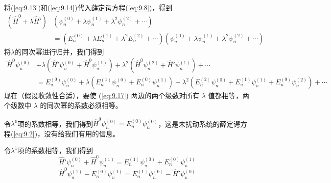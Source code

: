     将(\ref{eq:9.13})和(\ref{eq:9.14})代入薛定谔方程(\ref{eq:9.8})，得到
    \begin{equation*}
        \begin{aligned}
            \left(\hat{H}^0 + \lambda\hat{H}'\right)&\left(\psi_n^{\left(0\right)} + \lambda\psi_n^{\left(1\right)} + \lambda^2\psi_n^{\left(2\right)}+\cdots\right) \\
            &= \left(E_n^{\left(0\right)} + \lambda E_n^{\left(1\right)} + \lambda^2 E_n^{\left(2\right)}+\cdots\right)\left(\psi_n^{\left(0\right)} + \lambda\psi_n^{\left(1\right)} + \lambda^2\psi_n^{\left(2\right)}+\cdots\right)
        \end{aligned}
    \end{equation*}
    将$\lambda$的同次幂进行归并，我们得到
    \begin{equation}
        \begin{aligned}
            \hat{H}^0 \psi_n^{\left(0\right)} &+ \lambda \left(\hat{H}'\psi_n^{\left(0\right)} + \hat{H}^0\psi_n^{\left(1\right)}\right) + \lambda^2 \left(\hat{H}^0\psi_n^{\left(2\right)} + \hat{H}'\psi_n^{\left(1\right)}\right) + \cdots \\
            &= E_n^{\left(0\right)} \psi_n^{\left(0\right)} + \lambda \left(E_n^{\left(1\right)} \psi_n^{\left(0\right)} + E_n^{\left(0\right)} \psi_n^{\left(1\right)}\right) + \lambda^2 \left(E_n^{\left(2\right)} \psi_n^{\left(0\right)} + E_n^{\left(1\right)} \psi_n^{\left(1\right)} + E_n^{\left(0\right)} \psi_n^{\left(2\right)}\right) + \cdots
        \end{aligned}
        \label{eq:9.17}
    \end{equation}
    现在（假设收敛性合适），要使 (\ref{eq:9.17}) 两边的两个级数对所有 $\lambda$ 值都相等，两个级数中 $\lambda$ 的同次幂的系数必须相等。

    令$\lambda^0$项的系数相等，我们得到$\hat{H}^0 \psi_n^{\left(0\right)} = E_n^{\left(0\right)} \psi_n^{\left(0\right)}$，这是未扰动系统的薛定谔方程(\ref{eq:9.2})，没有给我们有用的信息。

    令$\lambda^1$项的系数相等，我们得到
    \begin{equation*}
        \hat{H}'\psi_n^{\left(0\right)} + \hat{H}^0\psi_n^{\left(1\right)} = E_n^{\left(1\right)} \psi_n^{\left(0\right)} + E_n^{\left(0\right)} \psi_n^{\left(1\right)}
    \end{equation*}
    \begin{equation}
        \hat{H}^0\psi_n^{\left(1\right)} - E_n^{\left(0\right)} \psi_n^{\left(1\right)} = E_n^{\left(1\right)} \psi_n^{\left(0\right)} - \hat{H}'\psi_n^{\left(0\right)}
        \label{eq:9.18}
    \end{equation}

